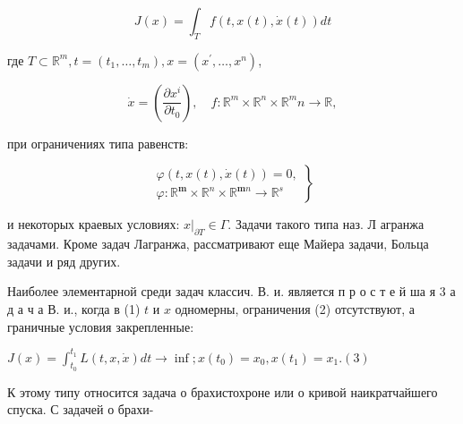 \documentclass[10pt]{article}
\begin{document}
\[

J(x)=\int_{T} f(t, x(t), \dot{x}(t)) d t

\]



где $T \subset \mathbb{R}^{m}, t=\left(t_{1}, \ldots, t_{m}\right), x=\left(x^{\prime}, \ldots, x^{n}\right)$,



\[

\dot{x}=\left(\frac{\partial x^{i}}{\partial t_{0}}\right), \quad f: \mathbb{R}^{m} \times \mathbb{R}^{n} \times \mathbb{R}^{m} n \longrightarrow \mathbb{R},

\]



при ограничениях типа равенств:



\[

\left.\begin{array}{l}

\varphi(t, x(t), \dot{x}(t))=0, \\

\varphi: \mathbb{R}^{\boldsymbol{m}} \times \mathbb{R}^{n} \times \mathbb{R}^{\boldsymbol{m} n} \longrightarrow \mathbb{R}^{s}

\end{array}\right\}

\]



и некоторых краевых условиях: $\left.x\right|_{\partial T} \in \Gamma$. Задачи такого типа наз. Л агранжа задачами. Кроме задач Лагранжа, рассматривают еще Майера задачи, Больца задачи и ряд других.



Наиболее элементарной среди задач классич. В. и. является п р о с т е й ша я 3 а д а ч а В. и., когда в (1) $t$ и $x$ одномерны, ограничения (2) отсутствуют, а граничные условия закрепленные:



$J(x)=\int_{t_{0}}^{t_{1}} L(t, x, \dot{x}) d t \longrightarrow \inf ; x\left(t_{0}\right)=x_{0}, x\left(t_{1}\right)=x_{1} .(3)$



К этому типу относится задача о брахистохроне или о кривой наикратчайшего спуска. С задачей о брахи-
\end{document}
